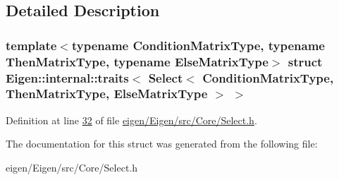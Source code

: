 \subsection{Detailed Description}
\subsubsection*{template$<$typename Condition\+Matrix\+Type, typename Then\+Matrix\+Type, typename Else\+Matrix\+Type$>$\newline
struct Eigen\+::internal\+::traits$<$ Select$<$ Condition\+Matrix\+Type, Then\+Matrix\+Type, Else\+Matrix\+Type $>$ $>$}



Definition at line \hyperlink{eigen_2_eigen_2src_2_core_2_select_8h_source_l00032}{32} of file \hyperlink{eigen_2_eigen_2src_2_core_2_select_8h_source}{eigen/\+Eigen/src/\+Core/\+Select.\+h}.



The documentation for this struct was generated from the following file\+:\begin{DoxyCompactItemize}
\item 
eigen/\+Eigen/src/\+Core/\+Select.\+h\end{DoxyCompactItemize}
